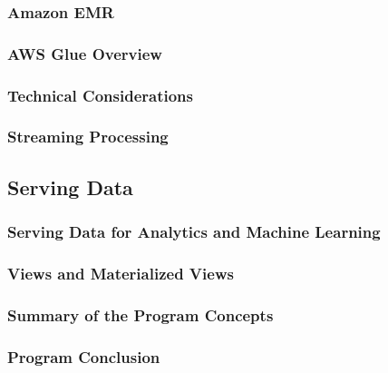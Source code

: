 \subsubsection{Amazon EMR}
\subsubsection{AWS Glue Overview}
\subsubsection{Technical Considerations}
\subsubsection{Streaming Processing}

\subsection{Serving Data}
\subsubsection{Serving Data for Analytics and Machine Learning}
\subsubsection{Views and Materialized Views}
\subsubsection{Summary of the Program Concepts}
\subsubsection{Program Conclusion}